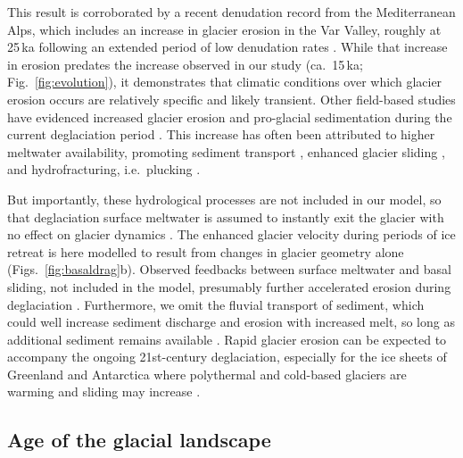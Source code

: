 \documentclass[esurf, manuscript]{copernicus}
\begin{document}
    This result is corroborated by a recent denudation record from the
    Mediterranean Alps, which includes an increase in glacier erosion in the
    Var Valley, roughly at 25\,ka following an extended period of low
    denudation rates \citep{Mariotti.etal.2021}. While that increase in
    erosion predates the increase observed in our study (ca.~15\,ka;
    Fig.~\ref{fig:evolution}), it demonstrates that climatic conditions
    over which glacier erosion occurs are relatively specific and likely
    transient. Other field-based studies have evidenced increased glacier
    erosion and pro-glacial sedimentation during the current deglaciation period
    \citep[e.g.,][]{Koppes.Montgomery.2009, Micheletti.Lane.2016,
    Lane.etal.2017, Bendixen.etal.2017}. This increase has often been
    attributed to higher meltwater availability, promoting sediment transport
    \citep{Delaney.Adhikari.2020}, enhanced glacier sliding
    \citep{Herman.etal.2011}, and hydrofracturing, i.e.~plucking
    \citep{Hallet.1996, Ugelvig.etal.2018, Hildes.etal.2004}.

    But importantly, these hydrological processes are not included in our
    model, so that deglaciation surface meltwater is assumed to instantly exit
    the glacier with no effect on glacier dynamics \citep[cf.][for comparison]
    {Werder.etal.2013, Iverson.2012, Ugelvig.etal.2018}. The enhanced glacier
    velocity during periods of ice retreat is here modelled to result from
    changes in glacier geometry alone (Figs.~\ref{fig:basaldrag}b).
    Observed feedbacks between
    surface meltwater and basal sliding, not included in the model, presumably
    further accelerated erosion during deglaciation \citep{Herman.etal.2011}.
    Furthermore, we omit the fluvial transport of sediment, which could well
    increase sediment discharge and erosion with increased melt, so long as
    additional sediment remains available \citep{Delaney.Adhikari.2020}. Rapid
    glacier erosion can be expected to accompany the ongoing 21st-century
    deglaciation, especially for the ice sheets of Greenland and
    Antarctica where polythermal and cold-based glaciers are warming and
    sliding may increase \citep[e.g.,][]{Moon.etal.2012, Mouginot.etal.2014,
    Overeem.etal.2017}.

\subsection{Age of the glacial landscape}
\end{document}
